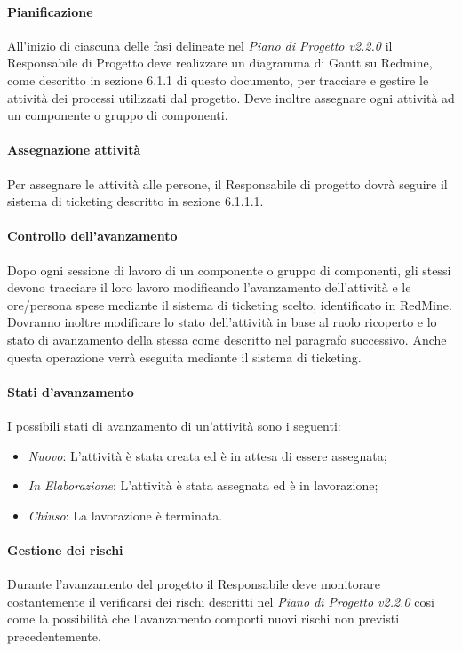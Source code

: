 \paragraph{Pianificazione \\}
\label{}
All'inizio di ciascuna delle fasi delineate nel \emph{Piano di Progetto v2.2.0} il Responsabile di Progetto deve realizzare un diagramma di Gantt su Redmine, come descritto in sezione 6.1.1 di questo documento, per tracciare e gestire le attività dei processi utilizzati dal progetto.
Deve inoltre assegnare ogni attività ad un componente o gruppo di componenti.
\paragraph{Assegnazione attività \\}
Per assegnare le attività alle persone, il Responsabile di progetto dovrà seguire il sistema di ticketing descritto in sezione 6.1.1.1. 
\paragraph{Controllo dell'avanzamento \\}
\label{}
Dopo ogni sessione di lavoro di un componente o gruppo di componenti, gli stessi devono tracciare il loro lavoro modificando l'avanzamento dell'attività e le ore/persona spese mediante il sistema di ticketing scelto, identificato in RedMine.
Dovranno inoltre modificare lo stato dell'attività in base al ruolo ricoperto e lo stato di avanzamento della stessa come descritto nel paragrafo successivo. Anche questa operazione verrà eseguita mediante il sistema di ticketing.
\paragraph{Stati d'avanzamento \\}
\label{}
I possibili stati di avanzamento di un'attività sono i seguenti:
\begin{itemize}
\item \emph{Nuovo}: L'attività è stata creata ed è in attesa di essere assegnata;
\item \emph{In Elaborazione}: L'attività è stata assegnata ed è in lavorazione;
\item \emph{Chiuso}: La lavorazione è terminata.
\end{itemize}



\paragraph{Gestione dei rischi \\}
\label{}
Durante l'avanzamento del progetto il Responsabile  deve monitorare costantemente il verificarsi dei rischi descritti nel \emph{Piano di Progetto v2.2.0} cosi come la possibilità che l'avanzamento comporti nuovi rischi non previsti precedentemente. 

